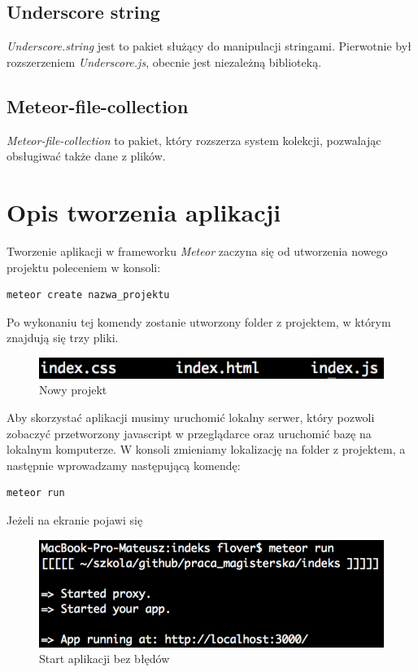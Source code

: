 \documentclass{xmgr}
\begin{document}
\subsection{Underscore string}
\indent \indent \indent \textit{Underscore.string} jest to pakiet służący do manipulacji stringami. Pierwotnie był rozszerzeniem \textit{Underscore.js}, obecnie jest niezależną biblioteką.

\subsection{Meteor-file-collection}
\indent \indent \indent \textit{Meteor-file-collection} to pakiet, który rozszerza system kolekcji, pozwalając obsługiwać także dane z plików.

\section{Opis tworzenia aplikacji}
\indent \indent \indent Tworzenie aplikacji w frameworku \textit{Meteor} zaczyna się od utworzenia nowego projektu poleceniem w konsoli:
\begin{lstlisting}[language=bash,caption={Tworzenie projektu}]
	meteor create nazwa_projektu
\end{lstlisting}

\noindent Po wykonaniu tej komendy zostanie utworzony folder z projektem, w którym znajdują się trzy pliki.

\begin{figure}[H]
\centering
\includegraphics[width=0.8\hsize]{images/newProject}
\caption{Nowy projekt\label{RYS.15}}
\end{figure}

Aby skorzystać aplikacji musimy uruchomić lokalny serwer, który pozwoli zobaczyć przetworzony javascript w przeglądarce oraz uruchomić bazę na lokalnym komputerze. W konsoli zmieniamy lokalizację na folder z projektem, a następnie wprowadzamy następującą komendę:

\begin{lstlisting}[language=bash,caption={Uruchomienie aplikacji}]
	meteor run
\end{lstlisting}

\noindent Jeżeli na ekranie pojawi się

\begin{figure}[th!]
\centering
\includegraphics[width=0.8\hsize]{images/succesfullStart}
\caption{Start aplikacji bez błędów\label{RYS.16}}
\end{figure}
\end{document}
